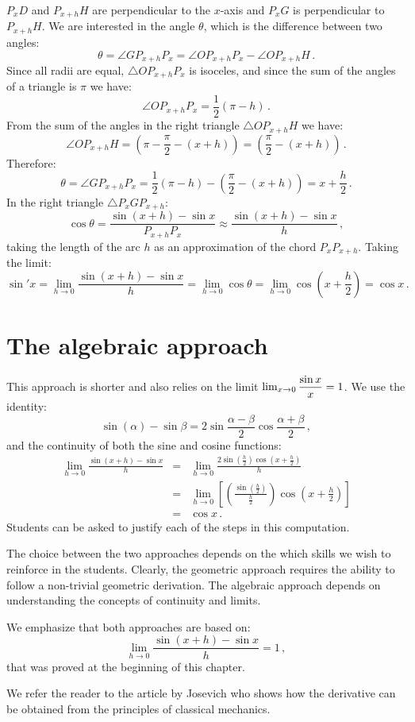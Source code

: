 $P_xD$ and $P_{x+h}H$ are perpendicular to the $x$-axis and $P_xG$ is perpendicular to $P_{x+h}H$.
We are interested in the angle $\theta$, which is the difference between two angles:
\[
\theta=\angle GP_{x+h}P_x= \angle OP_{x+h}P_x - \angle OP_{x+h}H\,.
\]
Since all radii are equal, $\triangle OP_{x+h}P_x$ is isoceles, and since the sum of the angles of a triangle is $\pi$ we have:
\[
\angle OP_{x+h}P_x=\frac{1}{2}(\pi - h)\,.
\]
From the sum of the angles in the right triangle $\triangle OP_{x+h}H$ we have:
\[
\angle OP_{x+h}H = \left(\pi-\frac{\pi}{2}-(x+h)\right) = \left(\frac{\pi}{2}-(x+h)\right)\,.
\]
Therefore:
\[
\theta = \angle GP_{x+h}P_x=\frac{1}{2}(\pi - h) - \left(\frac{\pi}{2}-(x+h)\right) = x+\frac{h}{2}\,.
\]
In the right triangle $\triangle P_xGP_{x+h}$:
\[
\cos \theta = \frac{\sin(x+h)\!-\!\sin x}{P_{x+h}P_x}\approx \frac{\sin(x+h)\!-\!\sin x}{h}\,,
\]
taking the length of the arc $h$ as an approximation of the chord $P_xP_{x+h}$. Taking the limit:
\[
\sin' x = \lim_{h\rightarrow 0} \frac{\sin(x+h)\!-\!\sin x}{h} =  \lim_{h\rightarrow 0}\cos \theta = \lim_{h\rightarrow 0} \cos \left(x+\frac{h}{2}\right) = \cos x\,.
\]

\section{The algebraic approach}

This approach is shorter and also relies on the limit $\lim_{x\rightarrow 0} \displaystyle\frac{\sin x}{x} = 1$. We use the identity:
\[
\sin(\alpha) -\sin\beta = 2\sin \frac{\alpha-\beta}{2}\cos \frac{\alpha+\beta}{2}\,,
\]
and the continuity of both the sine and cosine functions:
\begin{eqnarray*}
\lim_{h\rightarrow 0} \frac{\sin(x+h)\!-\!\sin x}{h}&=& \lim_{h\rightarrow 0} \frac{2\sin(\frac{h}{2})\cos(x+\frac{h}{2})}{h}\\
&=&\lim_{h\rightarrow 0}
  \left[
    \left( 
      \frac{\sin(\frac{h}{2})}{\frac{h}{2}}
    \right)
    \cos\left( x+\frac{h}{2} \right)
   \right]\\
& =& \cos x\,.
\end{eqnarray*}
Students can be asked to justify each of the steps in this computation.

The choice between the two approaches depends on the which skills we wish to reinforce in the students.
Clearly, the geometric approach requires the ability to follow a non-trivial geometric derivation. 
The algebraic approach depends on understanding the concepts of continuity and limits.

We emphasize that both approaches are based on:
\[
\lim_{h\rightarrow 0} \frac{\sin(x+h)\!-\!\sin x}{h} =1\,,
\]
that was proved at the beginning of this chapter.

We refer the reader to the article by Josevich \cite{josevich} who shows how the derivative can be obtained from the principles of classical mechanics.

